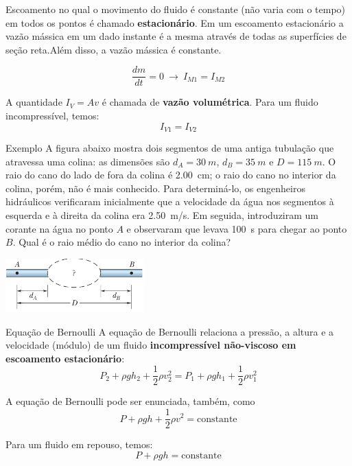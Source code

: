 \begin{frame}
Escoamento no qual o movimento do fluido é constante (não varia com o tempo) em
todos os pontos é chamado \textbf{estacionário}. Em um escoamento estacionário
a vazão mássica em um dado instante é a mesma através de todas as superfícies
de seção reta.Além disso, a vazão mássica é constante.

\[
\frac{dm}{dt}=0 ~\rightarrow~ I_{M1}=I_{M2}
\]

A quantidade $I_V = Av$ é chamada de \textbf{vazão volumétrica}. Para um fluido incompressível, temos:
\[
I_{V1}=I_{V2}
\]
\end{frame}

\begin{frame}{Exemplo}
A figura abaixo mostra dois segmentos de uma antiga tubulação que atravessa uma
colina: as dimensões são \(d_A = \SI{30}{m}\), \(d_B=\SI{35}{m}\) e
\(D=\SI{115}{m}\). O raio do cano do lado de fora da colina é \SI{2.00}{cm}; o
raio do cano no interior da colina, porém, não é mais conhecido. Para
determiná-lo, os engenheiros hidráulicos verificaram inicialmente que a
velocidade da água nos segmentos à esquerda e à direita da colina era
\SI{2.50}{m/s}. Em seguida, introduziram um corante na água no ponto \(A\) e
observaram que levava \SI{100}{s} para chegar ao ponto \(B\). Qual é o raio
médio do cano no interior da colina?

\begin{center}
\includegraphics[width=0.4\textwidth]{images/colina}
\end{center}

\end{frame}

\begin{frame}{Equação de Bernoulli}
A equação de Bernoulli relaciona a pressão, a altura e a velocidade (módulo) de
um fluido \textbf{incompressível não-viscoso em escoamento estacionário}:
\[
P_2+\rho g h_2 + \frac{1}{2}\rho v^2_2 = P_1+\rho g h_1 + \frac{1}{2}\rho v^2_1
\]

A equação de Bernoulli pode ser enunciada, também, como
\[
P+\rho g h + \frac{1}{2}\rho v^2 = \mathrm{constante}
\]

Para um fluido em repouso, temos:
\[
P+\rho g h = \mathrm{constante}
\]
\end{frame}

